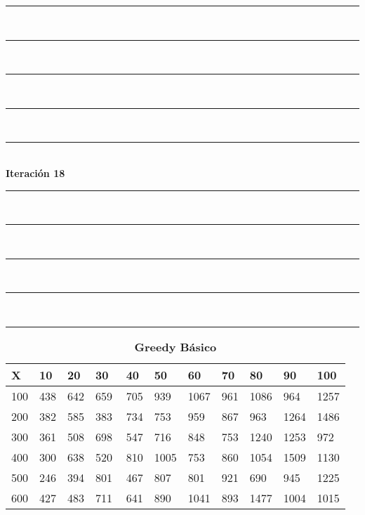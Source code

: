 \documentclass[10pt,letterpaper]{article}
\begin{document}
\newpage 
\begin{center}
\newcommand{\HRule}{\rule{\linewidth}{0.5mm}}
\center
\HRule\\[6cm]
\HRule\\[0.4cm]
\HRule\\[0.4cm]
\HRule\\[0.4cm]
\HRule\\[0.4cm]
{\centering \Huge\bfseries Iteración 18}\\[0.4cm]
\HRule\\[0.4cm]
\HRule\\[0.4cm]
\HRule\\[0.4cm]
\HRule\\[6cm]
\HRule
\end{center}
\newpage 
{}
\begin{center}
\begin{table}\renewcommand{\arraystretch}{2.5}
\caption{\large \textbf{Greedy Básico}}
\centering
\begin{tabular} { |m{0.5cm}|m{1.3cm}|m{1.3cm}|m{1.3cm}|m{1.3cm}|m{1.3cm}|m{1.3cm}|m{1.3cm}|m{1.3cm}|m{1.3cm}|m{1.3cm}|} 
\hline
\rowcolor{Gray}
\centering \textbf{X} & \centering \textbf{10} & \centering \textbf{20} & \centering \textbf{30}\ & \centering \textbf{40} & \centering \textbf{50} & \centering \textbf{60}\ & \centering \textbf{70} & \centering \textbf{80} & \centering \textbf{90}\ & \textbf{100} \\\hline
\cellcolor{Gray}100 & \Large 438 & \Large 642 & \Large 659 & \Large 705 & \Large 939 & \Large 1067 & \Large 961 & \Large 1086 & \Large 964 & \Large 1257 \\
\hline
\cellcolor{Gray}200 & \Large 382 & \Large 585 & \Large 383 & \Large 734 & \Large 753 & \Large 959 & \Large 867 & \Large 963 & \Large 1264 & \Large 1486 \\
\hline
\cellcolor{Gray}300 & \Large 361 & \Large 508 & \Large 698 & \Large 547 & \Large 716 & \Large 848 & \Large 753 & \Large 1240 & \Large 1253 & \Large 972 \\
\hline
\cellcolor{Gray}400 & \Large 300 & \Large 638 & \Large 520 & \Large 810 & \Large 1005 & \Large 753 & \Large 860 & \Large 1054 & \Large 1509 & \Large 1130 \\
\hline
\cellcolor{Gray}500 & \Large 246 & \Large 394 & \Large 801 & \Large 467 & \Large 807 & \Large 801 & \Large 921 & \Large 690 & \Large 945 & \Large 1225 \\
\hline
\cellcolor{Gray}600 & \Large 427 & \Large 483 & \Large 711 & \Large 641 & \Large 890 & \Large 1041 & \Large 893 & \Large 1477 & \Large 1004 & \Large 1015 \\

\end{tabular}
\end{table}
\end{center}
\end{document}
